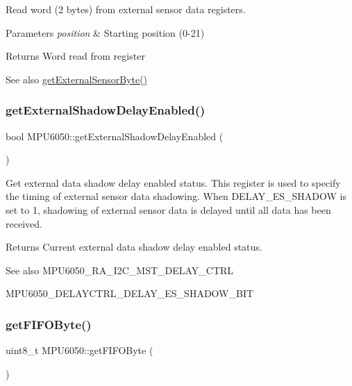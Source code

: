 Read word (2 bytes) from external sensor data registers. 
\begin{DoxyParams}{Parameters}
{\em position} & Starting position (0-\/21) \\
\hline
\end{DoxyParams}
\begin{DoxyReturn}{Returns}
Word read from register 
\end{DoxyReturn}
\begin{DoxySeeAlso}{See also}
\mbox{\hyperlink{class_m_p_u6050_a7f786ab4264f40e5a95e8937ec9adcc2}{get\+External\+Sensor\+Byte()}} 
\end{DoxySeeAlso}
\mbox{\label{class_m_p_u6050_a0e5cb13838298609b5260fd1558f8c92}} 
\subsubsection{\texorpdfstring{getExternalShadowDelayEnabled()}{getExternalShadowDelayEnabled()}}
{\footnotesize\ttfamily bool M\+P\+U6050\+::get\+External\+Shadow\+Delay\+Enabled (\begin{DoxyParamCaption}{ }\end{DoxyParamCaption})}

Get external data shadow delay enabled status. This register is used to specify the timing of external sensor data shadowing. When D\+E\+L\+A\+Y\+\_\+\+E\+S\+\_\+\+S\+H\+A\+D\+OW is set to 1, shadowing of external sensor data is delayed until all data has been received. \begin{DoxyReturn}{Returns}
Current external data shadow delay enabled status. 
\end{DoxyReturn}
\begin{DoxySeeAlso}{See also}
M\+P\+U6050\+\_\+\+R\+A\+\_\+\+I2\+C\+\_\+\+M\+S\+T\+\_\+\+D\+E\+L\+A\+Y\+\_\+\+C\+T\+RL 

M\+P\+U6050\+\_\+\+D\+E\+L\+A\+Y\+C\+T\+R\+L\+\_\+\+D\+E\+L\+A\+Y\+\_\+\+E\+S\+\_\+\+S\+H\+A\+D\+O\+W\+\_\+\+B\+IT 
\end{DoxySeeAlso}
\mbox{\label{class_m_p_u6050_a7733011d30d5b64564f6b5422d8639ae}} 
\subsubsection{\texorpdfstring{getFIFOByte()}{getFIFOByte()}}
{\footnotesize\ttfamily uint8\+\_\+t M\+P\+U6050\+::get\+F\+I\+F\+O\+Byte (\begin{DoxyParamCaption}{ }\end{DoxyParamCaption})}

